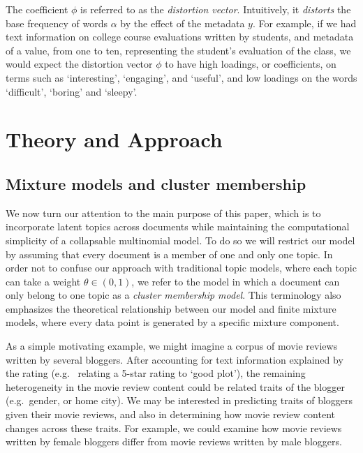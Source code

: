 \documentclass[12pt]{article}
\begin{document}
The coefficient $\phi$ is referred to as the \textit{distortion vector}. Intuitively, it \textit{distorts} the base frequency of words $\alpha$ by the effect of the metadata $y$. 
For example, if we had text information on college course evaluations written by students, and metadata of a value, from one to ten, representing the student's evaluation of the class, we would expect the distortion vector $\phi$ to have high loadings, or coefficients, on terms such as `interesting', `engaging', and `useful', and low loadings on the words `difficult', `boring' and `sleepy'. 

\section{Theory and Approach}\label{theory-and-approach}

\subsection{Mixture models and cluster
membership}\label{mixture-models-and-cluster-membership}

We now turn our attention to the main purpose of this paper, which is to
incorporate latent topics across documents while maintaining the computational simplicity of a collapsable multinomial model. To do so we will restrict our model by assuming that every document is a member of one and only one topic. In order not to confuse our approach with traditional topic models, where each topic can take a weight $\theta \in (0,1)$, we refer to the model in which a document can only belong to one topic as a \textit{cluster membership model}. This terminology also emphasizes the theoretical relationship between our model and finite mixture models, where every data point is generated by a specific mixture component.

As a simple motivating example, we might imagine a corpus of
movie reviews written by several bloggers. After accounting for text
information explained by the rating (e.g. ~relating a 5-star rating to
`good plot'), the remaining heterogeneity in the movie review
content could be related traits of the blogger (e.g.~gender, or home
city). We may be interested in predicting traits of bloggers
given their movie reviews, and also in determining how movie review
content changes across these traits. For example, we could examine how movie reviews written by 
female bloggers differ from movie reviews written by male bloggers.
\end{document}
